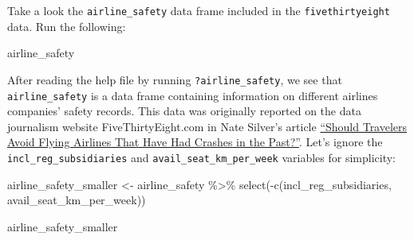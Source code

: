 \documentclass[
  letterpaper,
  DIV=11,
  numbers=noendperiod]{scrreprt}
\newenvironment{Shaded}{\begin{snugshade}}{\end{snugshade}}
\newcommand{\FunctionTok}[1]{\textcolor[rgb]{0.28,0.35,0.67}{#1}}
\newcommand{\NormalTok}[1]{\textcolor[rgb]{0.00,0.23,0.31}{#1}}
\newcommand{\OtherTok}[1]{\textcolor[rgb]{0.00,0.23,0.31}{#1}}
\newcommand{\SpecialCharTok}[1]{\textcolor[rgb]{0.37,0.37,0.37}{#1}}
\theoremstyle{definition}
\theoremstyle{remark}
\begin{document}
\begin{tcolorbox}[enhanced jigsaw, coltitle=black, toprule=.15mm, bottomtitle=1mm, breakable, leftrule=.75mm, title={{🎯} Learning Check 4.3}, opacitybacktitle=0.6, colback=white, rightrule=.15mm, opacityback=0, toptitle=1mm, colbacktitle=quarto-callout-tip-color!10!white, colframe=quarto-callout-tip-color-frame, titlerule=0mm, arc=.35mm, bottomrule=.15mm, left=2mm]
Take a look the \texttt{airline\_safety} data frame included in the
\texttt{fivethirtyeight} data. Run the following:

\begin{Shaded}
\begin{Highlighting}[]
\NormalTok{airline\_safety}
\end{Highlighting}
\end{Shaded}

After reading the help file by running \texttt{?airline\_safety}, we see
that \texttt{airline\_safety} is a data frame containing information on
different airlines companies' safety records. This data was originally
reported on the data journalism website FiveThirtyEight.com in Nate
Silver's article
\href{https://fivethirtyeight.com/features/should-travelers-avoid-flying-airlines-that-have-had-crashes-in-the-past/}{``Should
Travelers Avoid Flying Airlines That Have Had Crashes in the Past?''}.
Let's ignore the \texttt{incl\_reg\_subsidiaries} and
\texttt{avail\_seat\_km\_per\_week} variables for simplicity:

\begin{Shaded}
\begin{Highlighting}[]
\NormalTok{airline\_safety\_smaller }\OtherTok{\textless{}{-}}\NormalTok{ airline\_safety }\SpecialCharTok{\%\textgreater{}\%} 
  \FunctionTok{select}\NormalTok{(}\SpecialCharTok{{-}}\FunctionTok{c}\NormalTok{(incl\_reg\_subsidiaries, avail\_seat\_km\_per\_week))}

\NormalTok{airline\_safety\_smaller}
\end{Highlighting}
\end{Shaded}


\end{tcolorbox}
\end{document}
